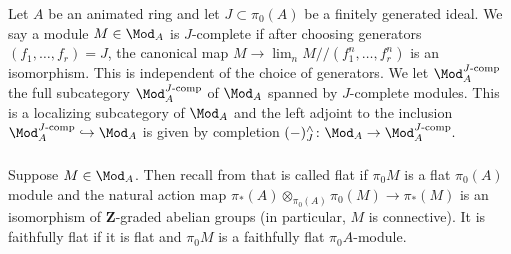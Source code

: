 \documentclass[10pt,reqno]{amsart}
\numberwithin{equation}{section}
\newcommand{\ZZ}{\mathbf{Z}}
\newcommand{\spec}{{\mathrm{Spec}}}
\newcommand{\into}{\hookrightarrow}
\begin{document}

\subsubsection{ }\label{complete} Let $A$ be an animated ring  and let $J\subset \pi_0(A)$ be a finitely generated ideal. We say a module $M\in \Mod_A$ is $J$-complete if after choosing generators $(f_1,\ldots, f_r)=J$, the canonical map $M\to \lim_n M/\!\!/(f_1^n,\ldots, f_r^n)$ is an isomorphism. This is independent of the choice of generators. We let  $\Mod_A^{J\text{-}\mathrm{comp}}$ the full subcategory $\Mod_A^{J\text{-}\mathrm{comp}}$ of $\Mod_A$ spanned by $J$-complete modules. This is a localizing subcategory of $\Mod_A$ and the left adjoint to the inclusion $\Mod_{A}^{J\text{-}\mathrm{comp}}\into \Mod_A$ is given by completion $(-)^\wedge_J\colon \Mod_A\to \Mod_{A}^{J\text{-}\mathrm{comp}}.$ %




\subsubsection{}\label{flatness} Suppose $M\in \Mod_A$. Then recall from \cite[Definition 7.2.2.10]{HA} that  is called flat if $\pi_0M$ is a flat $\pi_0(A)$ module and the natural action map $\pi_*(A)\otimes_{\pi_0(A)}\pi_0(M)\to \pi_*(M)$ is an isomorphism of $\ZZ$-graded abelian groups (in particular, $M$ is connective). It is faithfully flat if it is flat and $\pi_0M$ is a faithfully flat $\pi_0A$-module. 
\end{document}
